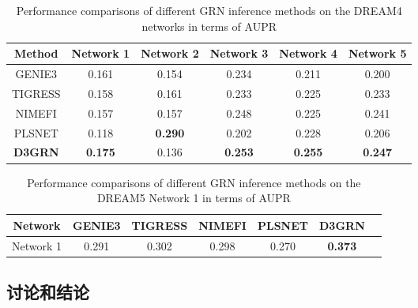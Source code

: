 \begin{table}[!htbp]
  \centering
  \begin{threeparttable}  
  \caption{Performance comparisons of different GRN inference methods on the DREAM4 networks in terms of AUPR}
  \label{tab:performance_dr4} 
    \begin{tabular}{cccccc}  
    \toprule  
    Method
     & Network 1&  Network 2&  Network 3&  Network 4 & Network 5\\
    \midrule  
    GENIE3  &0.161   &0.154           &0.234      &0.211          &0.200                 \\
    TIGRESS &0.158   &0.161           &0.233      &0.225          &0.233                \\
    NIMEFI  &0.157   &0.157           &0.248      &0.225          &0.241                \\
    PLSNET  &0.118   &\textbf{0.290}  &0.202      &0.228          &0.206                \\
    \textbf{D3GRN}   &\textbf{0.175}  &0.136      &\textbf{0.253} &\textbf{0.255}       &\textbf{0.247}  \\
    \bottomrule  
    \end{tabular}  
   \end{threeparttable}
\end{table} 

\begin{table}[!htbp]
  \begin{threeparttable}  
  \caption{Performance comparisons of different GRN inference methods on the DREAM5 Network 1 in terms of AUPR}  
  \label{tab:performance_dr5} 
    \begin{tabular}{ccccccc}  
    \toprule  
    Network&GENIE3 &TIGRESS &NIMEFI  &PLSNET &\textbf{D3GRN}\\
    \midrule  
    Network 1&0.291 &0.302 &0.298 &0.270  &\textbf{0.373}\\
    \bottomrule  
    \end{tabular}  
    \end{threeparttable}
\end{table} 


\subsection{讨论和结论}

